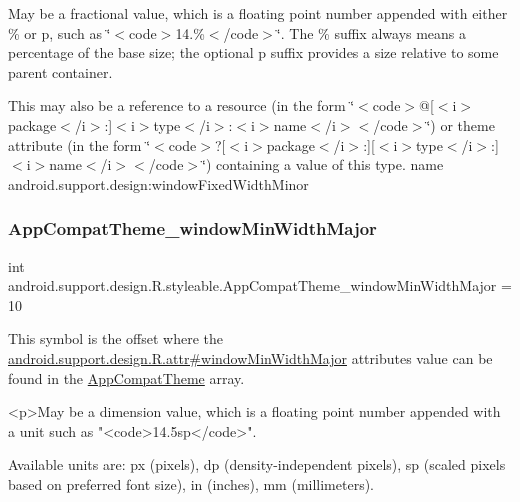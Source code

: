 May be a fractional value, which is a floating point number appended with either \% or p, such as \char`\"{}$<$code$>$14.\%$<$/code$>$\char`\"{}. The \% suffix always means a percentage of the base size; the optional p suffix provides a size relative to some parent container. 

This may also be a reference to a resource (in the form \char`\"{}$<$code$>$@\mbox{[}$<$i$>$package$<$/i$>$\+:\mbox{]}$<$i$>$type$<$/i$>$\+:$<$i$>$name$<$/i$>$$<$/code$>$\char`\"{}) or theme attribute (in the form \char`\"{}$<$code$>$?\mbox{[}$<$i$>$package$<$/i$>$\+:\mbox{]}\mbox{[}$<$i$>$type$<$/i$>$\+:\mbox{]}$<$i$>$name$<$/i$>$$<$/code$>$\char`\"{}) containing a value of this type.  name android.\+support.\+design\+:window\+Fixed\+Width\+Minor \mbox{\label{classandroid_1_1support_1_1design_1_1R_1_1styleable_a15a4daeba04d2f8277a443992fa1d153}} 
\subsubsection{\texorpdfstring{App\+Compat\+Theme\+\_\+window\+Min\+Width\+Major}{AppCompatTheme\_windowMinWidthMajor}}
{\footnotesize\ttfamily int android.\+support.\+design.\+R.\+styleable.\+App\+Compat\+Theme\+\_\+window\+Min\+Width\+Major = 10\hspace{0.3cm}{\ttfamily [static]}}

This symbol is the offset where the \hyperlink{classandroid_1_1support_1_1design_1_1R_1_1attr_a57d319f552fc373780a074bf8ab8d077}{android.\+support.\+design.\+R.\+attr\#window\+Min\+Width\+Major} attribute\textquotesingle{}s value can be found in the \hyperlink{classandroid_1_1support_1_1design_1_1R_1_1styleable_afb351dc8de20cbd4c89abe360373010c}{App\+Compat\+Theme} array.

\begin{DoxyVerb}      <p>May be a dimension value, which is a floating point number appended with a unit such as "<code>14.5sp</code>".
\end{DoxyVerb}
 Available units are\+: px (pixels), dp (density-\/independent pixels), sp (scaled pixels based on preferred font size), in (inches), mm (millimeters). 

